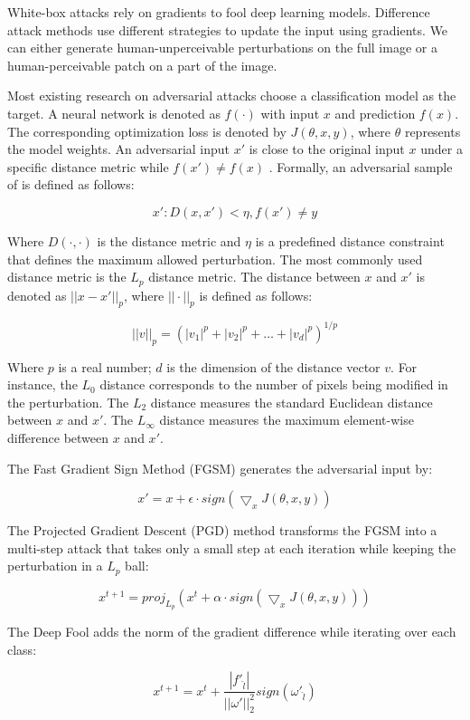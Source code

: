 White-box attacks rely on gradients to fool deep learning models. Difference attack methods use different strategies to update the input using gradients. We can either generate human-unperceivable perturbations on the full image or a human-perceivable patch on a part of the image.

Most existing research on adversarial attacks choose a classification model as the target. A neural network is denoted as $f(\cdot)$ with input $x$ and prediction $f(x)$. The corresponding optimization loss is denoted by $J(\theta, x, y)$, where $\theta$ represents the model weights. An adversarial input $x'$ is close to the original input $x$ under a specific distance metric while $f(x') \neq f(x)$ \citep{REN2020346}. Formally, an adversarial sample of  is defined as follows:

$$x': D(x, x') < \eta, f(x') \neq y $$

Where $D(\cdot, \cdot)$ is the distance metric and $ \eta $ is a predefined distance constraint that defines the maximum allowed perturbation. The most commonly used distance metric is the $L_p$ distance metric. The distance between $x$ and $x'$ is denoted as $||x-x'||_{p}$, where $||\cdot||_p$ is defined as follows:

$$ ||v||_p = (|v_1|^p + |v_2|^p + \dots + |v_d|^p)^{1/p} $$

Where $p$ is a real number; $d$ is the dimension of the distance vector $v$. For instance, the $L_0$ distance corresponds to the number of pixels being modified in the perturbation. The $L_2$ distance measures the standard Euclidean distance between $x$ and $x'$. The $L_\infty$ distance measures the maximum element-wise difference between $x$ and $x'$.

The Fast Gradient Sign Method (FGSM) \citep{goodfellow2015explaining} generates the adversarial input by:

$$ x' = x + \epsilon \cdot sign(\bigtriangledown_x J(\theta, x, y)) $$

The Projected Gradient Descent (PGD) \citep{madry2017towards} method transforms the FGSM into a multi-step attack that takes only a small step at each iteration while keeping the perturbation in a $L_p$ ball:

$$ x^{t+1} = proj_{L_p}(x^t + \alpha \cdot sign(\bigtriangledown_x J(\theta, x, y))) $$

The Deep Fool \citep{moosavidezfooli2016deepfool} adds the norm of the gradient difference while iterating over each class:

$$ x^{t+1} = x^t + \frac{|f'_{\hat{l}}|}{||\omega'||^2_2} sign(\omega'_{\hat{l}})$$

